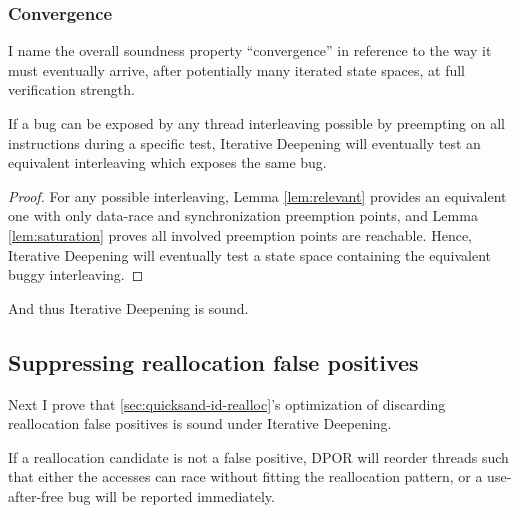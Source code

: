 \subsubsection{Convergence}

I name the overall soundness property ``convergence''
in reference to the way it must eventually arrive,
after potentially many iterated state spaces,
at full verification strength.

\vspace{0.5em}
\begin{theorem}[Convergence]
	If a bug can be exposed by any thread interleaving possible
	by preempting on all instructions during a specific test,
	Iterative Deepening will eventually test an equivalent interleaving which exposes the same bug.
        \label{thm:convergence}
\end{theorem}

\begin{proof}
	For any possible interleaving,
	Lemma \ref{lem:relevant} provides an equivalent one with only data-race and synchronization preemption points,
	and Lemma \ref{lem:saturation} proves all involved preemption points are reachable.
	Hence, Iterative Deepening will eventually test a state space containing the equivalent buggy interleaving.
\end{proof}

And thus Iterative Deepening is sound. %

\subsection{Suppressing reallocation false positives}
\label{sec:quicksand-realloc}

Next I prove that \cref{sec:quicksand-id-realloc}'s optimization
of discarding reallocation false positives is sound under Iterative Deepening.

\vspace{0.5em}
\begin{theorem}
        If a reallocation candidate is not a false positive,
DPOR will reorder threads such that
either
the accesses can race without fitting the reallocation pattern,
or a use-after-free bug will be reported immediately.
\end{theorem}

